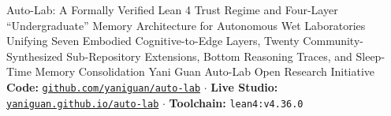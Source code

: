 \documentclass[10pt,letterpaper]{article}
\begin{document}
\makeautolabtitle
  {Auto-Lab: A Formally Verified Lean 4 Trust Regime and Four-Layer ``Undergraduate'' Memory Architecture for Autonomous Wet Laboratories}
  {Unifying Seven Embodied Cognitive-to-Edge Layers, Twenty Community-Synthesized Sub-Repository Extensions, Bottom Reasoning Traces, and Sleep-Time Memory Consolidation}
  {Yani Guan}
  {Auto-Lab Open Research Initiative}
  {\textcolor{tealdeep}{\textbf{Code:}} \href{https://github.com/yaniguan/auto-lab}{\texttt{github.com/yaniguan/auto-lab}} \;\;$\cdot$\;\; \textcolor{tealdeep}{\textbf{Live Studio:}} \href{https://yaniguan.github.io/auto-lab/}{\texttt{yaniguan.github.io/auto-lab}} \;\;$\cdot$\;\; \textcolor{tealdeep}{\textbf{Toolchain:}} \texttt{lean4:v4.36.0}}
\end{document}
